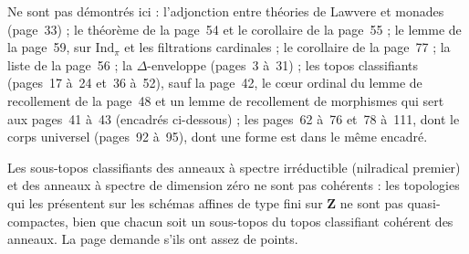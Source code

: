Ne sont pas démontrés ici : l'adjonction entre théories de Lawvere et monades (page~33) ; le théorème de la page~54 et le corollaire de la page~55 ; le lemme de la page~59, sur $\mathrm{Ind}_\pi$ et les filtrations cardinales ; le corollaire de la page~77 ; la liste de la page~56 ; la $\Delta$-enveloppe (pages~3 à~31) ; les topos classifiants (pages~17 à~24 et~36 à~52), sauf la page~42, le cœur ordinal du lemme de recollement de la page~48 et un lemme de recollement de morphismes qui sert aux pages~41 à~43 (encadrés ci-dessous) ; les pages~62 à~76 et~78 à~111, dont le corps universel (pages~92 à~95), dont une forme est dans le même encadré.

\begin{encadre}
\begin{theoreme*}\nonverifie
Les sous-topos classifiants des anneaux à spectre irréductible (nilradical premier) et des anneaux à spectre de dimension zéro ne sont pas cohérents : les topologies qui les présentent sur les schémas affines de type fini sur $\mathbf Z$ ne sont pas quasi-compactes, bien que chacun soit un sous-topos du topos classifiant cohérent des anneaux. La page demande s'ils ont assez de points.
\end{theoreme*}
\end{encadre}
